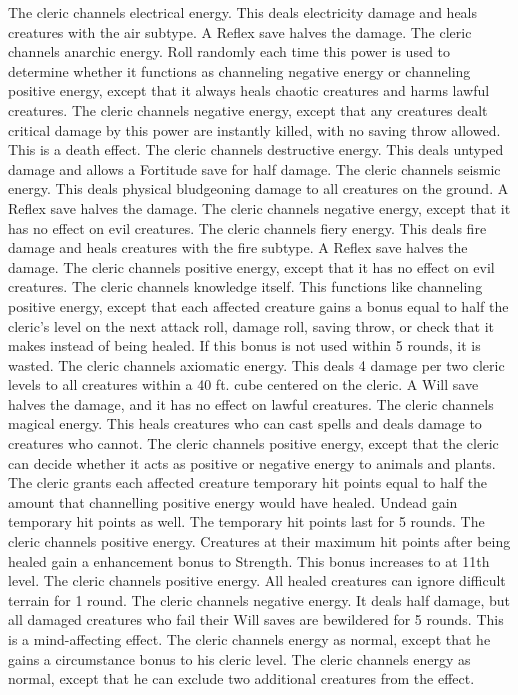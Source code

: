  The cleric channels electrical energy. This deals electricity damage and heals creatures with the air subtype. A Reflex save halves the damage.
 The cleric channels anarchic energy. Roll randomly each time this power is used to determine whether it functions as channeling negative energy or channeling positive energy, except that it always heals chaotic creatures and harms lawful creatures.
 The cleric channels negative energy, except that any creatures dealt critical damage by this power are instantly killed, with no saving throw allowed. This is a death effect.
 The cleric channels destructive energy. This deals untyped damage and allows a Fortitude save for half damage.
 The cleric channels seismic energy. This deals physical bludgeoning damage to all creatures on the ground. A Reflex save halves the damage.
 The cleric channels negative energy, except that it has no effect on evil creatures.
 The cleric channels fiery energy. This deals fire damage and heals creatures with the fire subtype. A Reflex save halves the damage.
 The cleric channels positive energy, except that it has no effect on evil creatures.
 The cleric channels knowledge itself. This functions like channeling positive energy, except that each affected creature gains a bonus equal to half the cleric's level on the next attack roll, damage roll, saving throw, or check that it makes instead of being healed. If this bonus is not used within 5 rounds, it is wasted.
 The cleric channels axiomatic energy. This deals 4 damage per two cleric levels to all creatures within a 40 ft. cube centered on the cleric. A Will save halves the damage, and it has no effect on lawful creatures.
 The cleric channels magical energy. This heals creatures who can cast spells and deals damage to creatures who cannot.
 The cleric channels positive energy, except that the cleric can decide whether it acts as positive or negative energy to animals and plants.
 The cleric grants each affected creature temporary hit points equal to half the amount that channelling positive energy would have healed. Undead gain temporary hit points as well. The temporary hit points last for 5 rounds.
 The cleric channels positive energy. Creatures at their maximum hit points after being healed gain a  enhancement bonus to Strength. This bonus increases to  at 11th level.
 The cleric channels positive energy. All healed creatures can ignore difficult terrain for 1 round.
 The cleric channels negative energy. It deals half damage, but all damaged creatures who fail their Will saves are bewildered for 5 rounds. This is a mind-affecting effect.
 The cleric channels energy as normal, except that he gains a  circumstance bonus to his cleric level.
 The cleric channels energy as normal, except that he can exclude two additional creatures from the effect.

